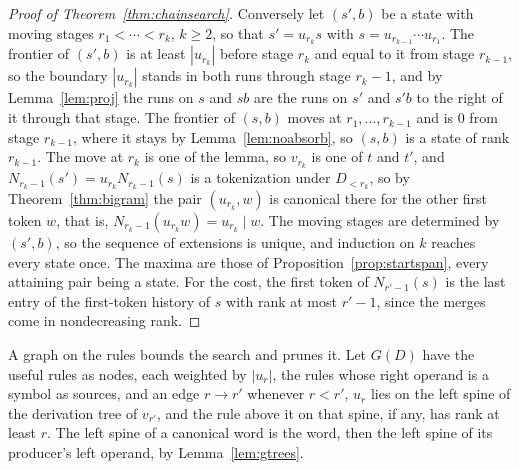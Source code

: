 \documentclass[11pt,a4paper]{article}
\theoremstyle{definition}
\theoremstyle{plain}
\begin{document}
\begin{proof}[Proof of Theorem~\ref{thm:chainsearch}]
Conversely let \((s', b)\) be a state with moving stages \(r_1 < \cdots < r_k\), \(k \ge 2\), so that \(s' = u_{r_k} s\)
with \(s = u_{r_{k-1}} \cdots u_{r_1}\). The frontier of \((s', b)\) is at least \(|u_{r_k}|\) before stage \(r_k\) and
equal to it from stage \(r_{k-1}\), so the boundary \(|u_{r_k}|\) stands in both runs through stage \(r_k - 1\), and by
Lemma~\ref{lem:proj} the runs on \(s\) and \(sb\) are the runs on \(s'\) and \(s'b\) to the right of it through that
stage. The frontier of \((s, b)\) moves at \(r_1, \dots, r_{k-1}\) and is \(0\) from stage \(r_{k-1}\), where it stays
by Lemma~\ref{lem:noabsorb}, so \((s, b)\) is a state of rank \(r_{k-1}\). The move at \(r_k\) is one of the lemma, so
\(v_{r_k}\) is one of \(t\) and \(t'\), and \(N_{r_k - 1}(s') = u_{r_k} N_{r_k - 1}(s)\) is a tokenization under
\(D_{<r_k}\), so by Theorem~\ref{thm:bigram} the pair \((u_{r_k}, w)\) is canonical there for the other first token
\(w\), that is, \(N_{r_k - 1}(u_{r_k} w) = u_{r_k} \mid w\). The moving stages are determined by \((s', b)\), so the
sequence of extensions is unique, and induction on \(k\) reaches every state once. The maxima are those of
Proposition~\ref{prop:startspan}, every attaining pair being a state. For the cost, the first token of \(N_{r'-1}(s)\)
is the last entry of the first-token history of \(s\) with rank at most \(r' - 1\), since the merges come in
nondecreasing rank.
\end{proof}

A graph on the rules bounds the search and prunes it. Let \(G(D)\) have the useful rules as nodes, each weighted by
\(|u_r|\), the rules whose right operand is a symbol as sources, and an edge \(r \to r'\) whenever \(r < r'\), \(u_r\)
lies on the left spine of the derivation tree of \(v_{r'}\), and the rule above it on that spine, if any, has rank at
least \(r\). The left spine of a canonical word is the word, then the left spine of its producer's left operand, by
Lemma~\ref{lem:gtrees}.

\end{document}
